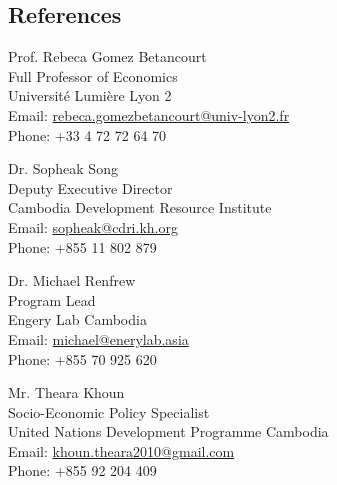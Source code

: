 \documentclass[10pt,a4paper]{article}
\begin{document}
\subsection*{References}		

\parbox{0.5\textwidth}{ %
	Prof. Rebeca Gomez Betancourt\\ 
	Full Professor of Economics\\ 
	Université Lumière Lyon 2\\
	Email: \href{mailto: Phone: rebeca.gomezbetancourt@univ-lyon2.fr}{rebeca.gomezbetancourt@univ-lyon2.fr}\\
	Phone: +33 4 72 72 64 70
}
\hfill %
\parbox{0.5\textwidth}{ %
	Dr. Sopheak Song\\ 
	Deputy Executive Director \\
	Cambodia Development Resource Institute\\ 
	Email: \href{mailto: sopheak@cdri.kh.org}{sopheak@cdri.kh.org}\\
	Phone: +855 11 802 879
}

\vspace{1.5em}
\parbox{0.5\textwidth}{ %
	Dr. Michael Renfrew\\ 
	Program Lead\\
	Engery Lab Cambodia\\ 
	Email: \href{mailto: michael@enerylab.asia}{michael@enerylab.asia}\\
	Phone: +855 70 925 620
}
\hfill %
\parbox{0.5\textwidth}{ %
	Mr. Theara Khoun \\ 
	Socio-Economic Policy Specialist \\
	United Nations Development Programme Cambodia\\
	Email: \href{mailto: khoun.theara2010@gmail.com}{khoun.theara2010@gmail.com}\\
	Phone: +855 92 204 409\\
}
\end{document}
